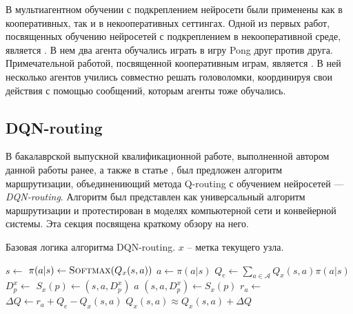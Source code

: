 \documentclass[specification,annotation,times]{itmo-student-thesis}
\theoremstyle{definition}
\begin{document}
В мультиагентном обучении с подкреплением нейросети были применены как в
кооперативных, так и в некооперативных сеттингах. Одной из первых работ,
посвященных обучению нейросетей с подкреплением в некооперативной среде,
является \cite{tampuu2017multiagent}. В нем два агента обучались играть в игру
Pong друг против друга. Примечательной работой, посвященной кооперативным играм,
является \cite{foerster2016learning}. В ней несколько агентов учились совместно
решать головоломки, координируя свои действия с помощью сообщений, которым
агенты тоже обучались.

\subsection{DQN-routing}\label{overview:dqn-routing}

В бакалаврской выпускной квалификационной работе, выполненной автором данной
работы ранее, а также в статье \cite{mukhutdinov2019multi}, был
предложен алгоритм маршрутизации, объединениющий метода Q-routing с обучением
нейросетей --- \textit{DQN-routing}. Алгоритм был представлен как универсальный
алгоритм маршрутизации и протестирован в моделях компьютерной сети и конвейерной
системы. Эта секция посвящена краткому обзору на него.

\begin{algorithm}[!h]
\caption{Базовая логика алгоритма DQN-routing. $x$ -- метка текущего узла.}
\label{dqnr-pseudocode}
\begin{algorithmic}[1]
   
    \State $s \gets $ 
    \State $\pi(a | s) \gets \textsc{Softmax}(Q_x(s, a))$ 
    \State $a \gets \pi(a | s)$
    \State $Q_e \gets \sum\limits_{a \in \mathcal{A}} {Q_x(s, a) \pi(a | s)}$
    \State $D_p^x \gets $ 
    \State $S_x(p) \gets (s, a, D_p^x)$
    \State {}
    \State \Return $a$ 
  \EndFunction
  \Statex
    \State $(s, a, D_p^x) \gets S_x(p)$
    \State $r_a \gets $ 
    \State $\Delta Q \gets r_a + Q_e - Q_x(s, a)$
    \State $Q_x(s, a) \approx Q_x(s, a) + \Delta Q$ 
  \EndProcedure
\end{algorithmic}
\end{algorithm}
\end{document}
